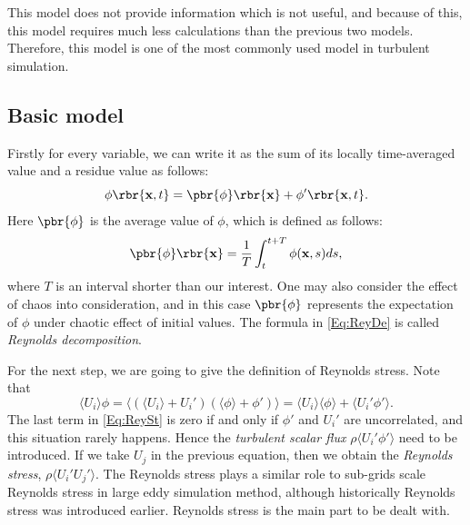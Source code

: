 \documentclass[english, nochinese]{pkupaper}
\begin{document}
This model does not provide information which is not useful, and because of this, this model requires much less calculations than the previous two models. Therefore, this model is one of the most commonly used model in turbulent simulation.

\subsection{Basic model}

Firstly for every variable, we can write it as the sum of its locally time-averaged value and a residue value as follows:
\begin{equation}\label{Eq:ReyDe}
\phi\rbr{ \mathbf{x} , t} = \pbr{\phi}\rbr{\mathbf{x}} + \phi'\rbr{\mathbf{x}, t}.
\end{equation}
Here $\pbr{\phi}$ is the average value of $\phi$, which is defined as follows:
\begin{equation}
\pbr{\phi} \rbr{\mathbf{x}} = \frac{1}{T} \int_t^{t+T}\phi(\mathbf{x}, s)ds,
\end{equation}
where $T$ is an interval shorter than our interest. One may also consider the effect of chaos into consideration, and in this case $\pbr{\phi}$ represents the expectation of $\phi$ under chaotic effect of initial values. The formula in \eqref{Eq:ReyDe} is called \emph{Reynolds decomposition}.

For the next step, we are going to give the definition of Reynolds stress. Note that
\begin{equation}\label{Eq:ReySt}
\langle U_i\rangle\phi = \langle(\langle U_i\rangle+U_i')(\langle\phi\rangle+\phi')\rangle = \langle U_i\rangle\langle\phi\rangle + \langle U_i'\phi'\rangle.
\end{equation}
The last term in \eqref{Eq:ReySt} is zero if and only if $\phi'$ and $U_i'$ are uncorrelated, and this situation rarely happens. Hence the \emph{turbulent scalar flux} $\rho\langle U_i'\phi'\rangle$ need to be introduced. If we take $U_j$ in the previous equation, then we obtain the \emph{Reynolds stress}, $\rho\langle U_i'U_j'\rangle$. The Reynolds stress plays a similar role to sub-grids scale Reynolds stress in large eddy simulation method, although historically Reynolds stress was introduced earlier. Reynolds stress is the main part to be dealt with.
\end{document}

